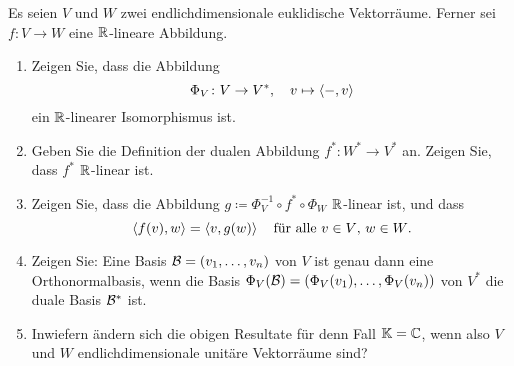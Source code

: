 \begin{question}[subtitle = Konstruktion der adjungierten Abbildung]{3}
  Es seien $V$ und $W$ zwei endlichdimensionale euklidische Vektorräume.
  Ferner sei $f \colon V \to W$ eine $\mathbb{R}$-lineare Abbildung.
  \begin{enumerate}[leftmargin=*]
    \item
      Zeigen Sie, dass die Abbildung
      \[
        \Phi_V \colon V \to V^*,
        \quad
        v \mapsto \left\langle -, v \right\rangle
      \]
      ein $\mathbb{R}$-linearer Isomorphismus ist.
    \item
      Geben Sie die Definition der dualen Abbildung $f^* \colon W^* \to V^*$ an.
      Zeigen Sie, dass $f^*$ $\mathbb{R}$-linear ist.
    \item
      Zeigen Sie, dass die Abbildung $g \coloneqq \Phi_V^{-1} \circ f^* \circ \Phi_W$ $\mathbb{R}$-linear ist, und dass
      \[
        \left\langle f(v), w \right\rangle = \left\langle v, g(w) \right\rangle
        \quad
        \text{für alle $v \in V$, $w \in W$}.
      \]
    \item
      Zeigen Sie:
      Eine Basis $\mathcal{B} = (v_1, \dotsc, v_n)$ von $V$ ist genau dann eine Orthonormalbasis, wenn die Basis $\Phi_V(\mathcal{B}) = (\Phi_V(v_1), \dotsc, \Phi_V(v_n))$ von $V^*$ die duale Basis $\mathcal{B}^*$ ist.
    \item
      Inwiefern ändern sich die obigen Resultate für denn Fall $\mathbb{K} = \mathbb{C}$, wenn also $V$ und $W$ endlichdimensionale unitäre Vektorräume sind?
  \end{enumerate}
\end{question}


